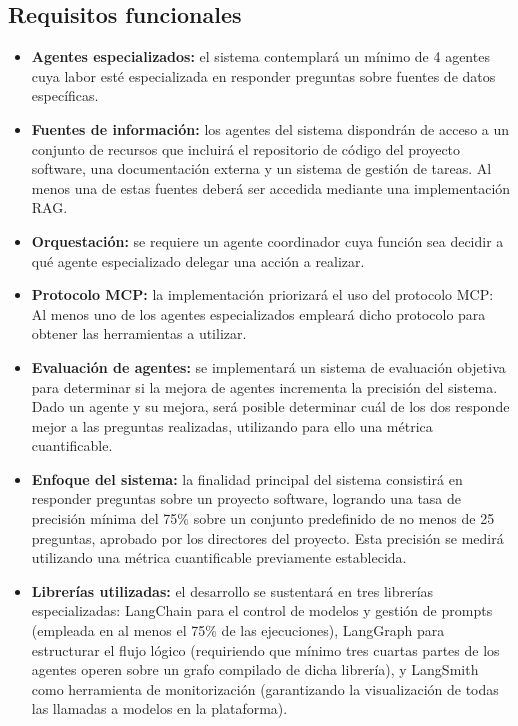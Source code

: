 \subsection{Requisitos funcionales}
\begin{itemize}
\item\textbf{Agentes especializados: }el sistema contemplará un mínimo de 4 agentes cuya labor esté especializada en responder preguntas sobre fuentes de datos específicas.
\item\textbf{Fuentes de información: }los agentes del sistema dispondrán de acceso a un conjunto de recursos que incluirá el repositorio de código del proyecto software, una documentación externa y un sistema de gestión de tareas. Al menos una de estas fuentes deberá ser accedida mediante una implementación RAG.
\item\textbf{Orquestación: }se requiere un agente coordinador cuya función sea decidir a qué agente especializado delegar una acción a realizar.
\item\textbf{Protocolo MCP: }la implementación priorizará el uso del protocolo MCP: Al menos uno de los agentes especializados empleará dicho protocolo para obtener las herramientas a utilizar.
\item\textbf{Evaluación de agentes: }se implementará un sistema de evaluación objetiva para determinar si la mejora de agentes incrementa la precisión del sistema. Dado un agente y su mejora, será posible determinar cuál de los dos responde mejor a las preguntas realizadas, utilizando para ello una métrica cuantificable.
\item\textbf{Enfoque del sistema: }la finalidad principal del sistema consistirá en responder preguntas sobre un proyecto software, logrando una tasa de precisión mínima del 75\% sobre un conjunto predefinido de no menos de 25 preguntas, aprobado por los directores del proyecto. Esta precisión se medirá utilizando una métrica cuantificable previamente establecida.
\item\textbf{Librerías utilizadas: }el desarrollo se sustentará en tres librerías especializadas: LangChain para el control de modelos y gestión de prompts (empleada en al menos el 75\% de las ejecuciones), LangGraph para estructurar el flujo lógico (requiriendo que mínimo tres cuartas partes de los agentes operen sobre un grafo compilado de dicha librería), y LangSmith como herramienta de monitorización (garantizando la visualización de todas las llamadas a modelos en la plataforma).
\end{itemize}

